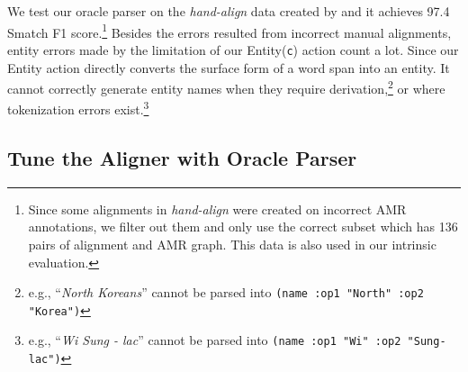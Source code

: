 \documentclass[11pt,a4paper]{article}
\begin{document}
We test our oracle parser on the {\it hand-align} data created by \citet{flanigan-EtAl:2014:P14-1}
and it achieves 97.4 Smatch F1 score.\footnote{
	Since some alignments in {\it hand-align} were created on incorrect AMR annotations, we filter out
	them and only use the correct subset which has 136 pairs of alignment and AMR graph.
	This data is also used in our intrinsic evaluation.}
Besides the errors resulted from incorrect manual alignments, entity errors made by the limitation of
our  {\sc Entity({\tt c})} action count a lot.
Since our {\sc Entity} action directly converts
the surface form of a word span into an entity. 
It cannot correctly generate 
entity names when they require derivation,\footnote{e.g., 
``{\it North Koreans}'' cannot be parsed into {\tt  (name :op1 "North" :op2 "Korea")}}
or where tokenization errors exist.\footnote{e.g., 
``{\it Wi Sung - lac}'' cannot be parsed into {\tt (name :op1 "Wi" :op2 "Sung-lac")} }


\subsection{Tune the Aligner with Oracle Parser}\label{sec:tune}
\end{document}

